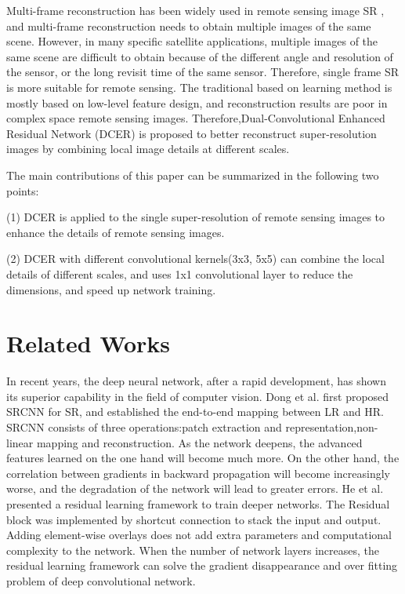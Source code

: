 \documentclass[runningheads,a4paper]{llncs}
\begin{document}
Multi-frame reconstruction has been widely used in remote sensing image SR \cite{Li2015Super,Zhang2014Super}, and multi-frame reconstruction needs to obtain multiple images of the same scene. However, in many specific satellite applications, multiple images of the same scene are difficult to obtain because of the different angle and resolution of the sensor, or the long revisit time of the same sensor. Therefore, single frame SR is more suitable for remote sensing. The traditional based on learning method\cite{Yang2010Image} is mostly based on low-level feature design, and reconstruction results are poor in complex space remote sensing images. Therefore,Dual-Convolutional Enhanced Residual Network (DCER) is proposed to better reconstruct super-resolution images by combining local image details at different scales.


The main contributions of this paper can be summarized in the following two points:

(1) DCER is applied to the single super-resolution of  remote sensing images to enhance the details of remote sensing images.

(2) DCER with different convolutional kernels(3x3, 5x5) can combine the local details of different scales, and uses 1x1 convolutional layer to reduce the dimensions, and speed up network training.


\section{Related Works}
In recent years, the deep neural network, after a rapid development, has shown its superior capability in the field of computer vision. Dong et al.\cite{Dong2014Learning}  first proposed SRCNN for SR, and established the end-to-end mapping between LR and HR. SRCNN consists of three operations:patch extraction and representation,non-linear mapping and reconstruction. As the network deepens, the advanced features learned on the one hand will become much more. On the other hand, the correlation between gradients in backward propagation will become increasingly worse, and the degradation of the network will lead to greater errors. He et al.\cite{He2015Deep} presented a residual learning framework to train deeper networks. The Residual block was implemented by shortcut connection to stack the input and output. Adding element-wise overlays does not add extra parameters and computational complexity to the network. When the number of  network layers increases, the residual learning framework can solve the gradient disappearance and over fitting problem of deep convolutional network.
\end{document}
